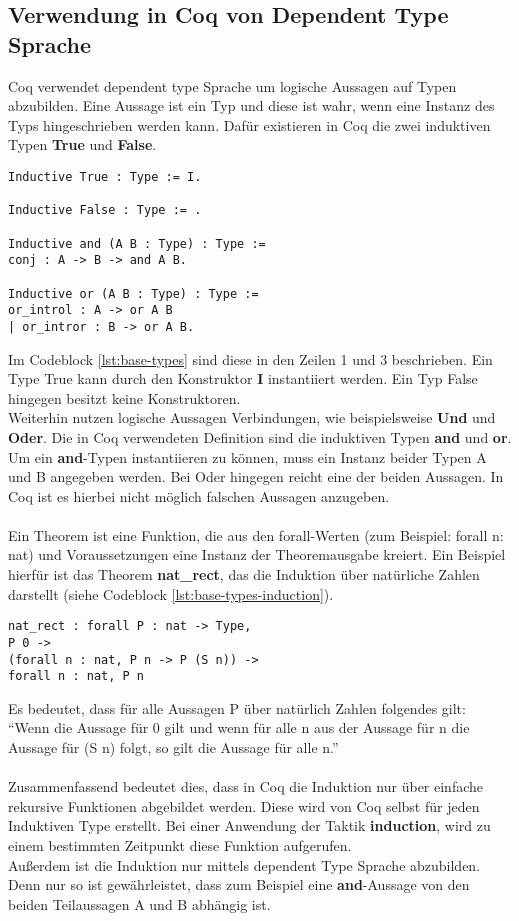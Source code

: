 \subsection{Verwendung in Coq von Dependent Type Sprache}
Coq verwendet dependent type Sprache um logische Aussagen auf Typen abzubilden.
Eine Aussage ist ein Typ und diese ist wahr, wenn eine
Instanz des Typs hingeschrieben werden kann.
Dafür existieren in Coq die zwei induktiven Typen \textbf{True} und \textbf{False}.
\begin{lstlisting}[language=coq,firstnumber=1,caption=Coq Basis Typen,label=lst:base-types]
Inductive True : Type := I.

Inductive False : Type := .

Inductive and (A B : Type) : Type :=
conj : A -> B -> and A B.

Inductive or (A B : Type) : Type :=
or_introl : A -> or A B
| or_intror : B -> or A B.
\end{lstlisting}
Im Codeblock \ref{lst:base-types} sind diese in den Zeilen 1 und 3 beschrieben. Ein Type True kann durch den Konstruktor \textbf{I} instantiiert werden. Ein Typ False hingegen besitzt keine Konstruktoren.\\
Weiterhin nutzen logische Aussagen Verbindungen, wie beispielsweise \textbf{Und} und \textbf{Oder}. Die in Coq verwendeten Definition sind die induktiven Typen \textbf{and} und \textbf{or}. Um ein \textbf{and}-Typen instantiieren zu können, muss ein Instanz beider Typen A und B angegeben werden. Bei Oder hingegen reicht eine der beiden Aussagen. In Coq ist es hierbei nicht möglich falschen Aussagen anzugeben.\\
\\
Ein Theorem ist eine Funktion, die aus den forall-Werten (zum Beispiel: forall n: nat) und Voraussetzungen eine Instanz der Theoremausgabe kreiert. Ein Beispiel hierfür ist das Theorem \textbf{nat\_rect}, das die Induktion über natürliche Zahlen darstellt (siehe Codeblock \ref{lst:base-types-induction}).
\begin{lstlisting}[language=coq,firstnumber=1,caption=Coq Induktion der natürlichen Zahlen,label=lst:base-types-induction]
nat_rect : forall P : nat -> Type,
P 0 ->
(forall n : nat, P n -> P (S n)) ->
forall n : nat, P n
\end{lstlisting}
Es bedeutet, dass für alle Aussagen P über natürlich Zahlen folgendes
gilt:\\
"`Wenn die Aussage für 0 gilt und wenn für alle n aus der Aussage
für n die Aussage für (S n) folgt, so gilt die Aussage für alle n."'\\
\\
Zusammenfassend bedeutet dies, dass in Coq die Induktion nur über einfache rekursive Funktionen abgebildet werden. Diese wird von Coq selbst für jeden Induktiven Type erstellt. Bei einer Anwendung der Taktik \textbf{induction}, wird zu einem bestimmten Zeitpunkt diese Funktion aufgerufen.\\
Außerdem ist die Induktion nur mittels dependent Type Sprache abzubilden. Denn nur so ist gewährleistet, dass zum Beispiel eine \textbf{and}-Aussage von den beiden Teilaussagen A und B abhängig ist.

